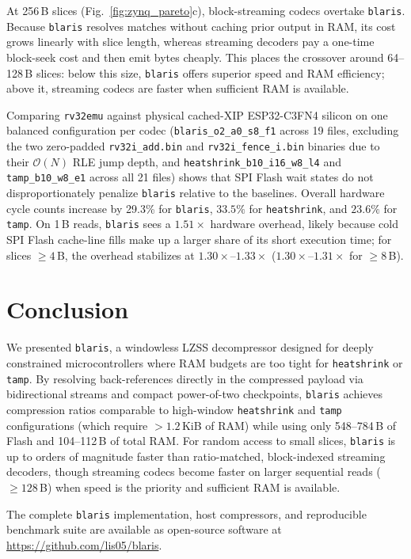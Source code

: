 \documentclass[10pt,twocolumn]{article}
\newcommand{\code}[1]{\texttt{#1}}
\begin{document}
At 256\,B slices (Fig.~\ref{fig:zynq_pareto}c), block-streaming codecs overtake
\code{blaris}. Because \code{blaris} resolves matches without caching prior
output in RAM, its cost grows linearly with slice length, whereas streaming
decoders pay a one-time block-seek cost and then emit bytes cheaply. This places
the crossover around 64--128\,B slices: below this size, \code{blaris} offers
superior speed and RAM efficiency; above it, streaming codecs are faster when
sufficient RAM is available.

Comparing \code{rv32emu} against physical cached-XIP ESP32-C3FN4 silicon on one
balanced configuration per codec (\code{blaris\_o2\_a0\_s8\_f1} across 19 files,
excluding the two zero-padded \code{rv32i\_add.bin} and
\code{rv32i\_fence\_i.bin} binaries due to their $\mathcal{O}(N)$ RLE jump
depth, and \code{heatshrink\_b10\_i16\_w8\_l4} and \code{tamp\_b10\_w8\_e1}
across all 21 files) shows that SPI Flash wait states do not disproportionately
penalize \code{blaris} relative to the baselines. Overall hardware cycle counts
increase by 29.3\% for \code{blaris}, $33.5\%$
for \code{heatshrink}, and $23.6\%$ for
\code{tamp}. On 1\,B reads, \code{blaris} sees a $1.51\times$ hardware overhead,
likely because cold SPI Flash cache-line fills make up a larger share of its
short execution time; for slices $\ge 4$\,B, the overhead stabilizes at
$1.30\times$--$1.33\times$ ($1.30\times$--$1.31\times$ for $\ge 8$\,B).

\section{Conclusion}
We presented \code{blaris}, a windowless LZSS decompressor designed for deeply
constrained microcontrollers where RAM budgets are too tight for
\code{heatshrink} or \code{tamp}. By resolving back-references directly in the
compressed payload via bidirectional streams and compact power-of-two
checkpoints, \code{blaris} achieves compression ratios comparable to high-window
\code{heatshrink} and \code{tamp} configurations (which require $>1.2$\,KiB of
RAM) while using only 548--784\,B of Flash and 104--112\,B of total RAM. For
random access to small slices, \code{blaris} is up to orders of magnitude faster
than ratio-matched, block-indexed streaming decoders, though streaming codecs
become faster on larger sequential reads ($\ge 128$\,B) when speed is the
priority and sufficient RAM is available.

The complete \code{blaris} implementation, host compressors, and reproducible
benchmark suite are available as open-source software at
\url{https://github.com/lis05/blaris}.
\end{document}
